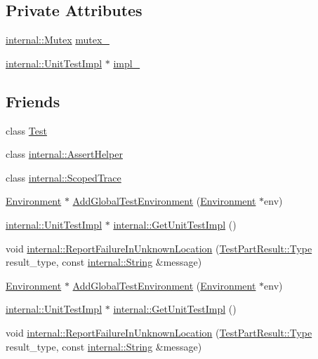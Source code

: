 \subsection*{\-Private \-Attributes}
\begin{DoxyCompactItemize}
\item 
\hyperlink{classtesting_1_1internal_1_1Mutex}{internal\-::\-Mutex} \hyperlink{classtesting_1_1UnitTest_ac9dde2076fedd43264499dc77faea627}{mutex\-\_\-}
\item 
\hyperlink{classtesting_1_1internal_1_1UnitTestImpl}{internal\-::\-Unit\-Test\-Impl} $\ast$ \hyperlink{classtesting_1_1UnitTest_ab9762ae576a7c728237a91400bd2c11f}{impl\-\_\-}
\end{DoxyCompactItemize}
\subsection*{\-Friends}
\begin{DoxyCompactItemize}
\item 
class \hyperlink{classtesting_1_1UnitTest_ab085d1bf4cff8b1045750706b11f8662}{\-Test}
\item 
class \hyperlink{classtesting_1_1UnitTest_a7375bdc46f0244d0011c2d15ee160473}{internal\-::\-Assert\-Helper}
\item 
class \hyperlink{classtesting_1_1UnitTest_ac93c943076897e55055643c28d06415d}{internal\-::\-Scoped\-Trace}
\item 
\hyperlink{classtesting_1_1Environment}{\-Environment} $\ast$ \hyperlink{classtesting_1_1UnitTest_a5ec26e4c31220ff8e769cc09689a4d6d}{\-Add\-Global\-Test\-Environment} (\hyperlink{classtesting_1_1Environment}{\-Environment} $\ast$env)
\item 
\hyperlink{classtesting_1_1internal_1_1UnitTestImpl}{internal\-::\-Unit\-Test\-Impl} $\ast$ \hyperlink{classtesting_1_1UnitTest_a56e56be7066957d612e53b5c60f6ac08}{internal\-::\-Get\-Unit\-Test\-Impl} ()
\item 
void \hyperlink{classtesting_1_1UnitTest_a8aa1029abd3a382c716d1c91fb16fe9c}{internal\-::\-Report\-Failure\-In\-Unknown\-Location} (\hyperlink{classtesting_1_1TestPartResult_a1d1cfd8ffb84e947f82999c682b666a7}{\-Test\-Part\-Result\-::\-Type} result\-\_\-type, const \hyperlink{classtesting_1_1internal_1_1String}{internal\-::\-String} \&message)
\item 
\hyperlink{classtesting_1_1Environment}{\-Environment} $\ast$ \hyperlink{classtesting_1_1UnitTest_a5ec26e4c31220ff8e769cc09689a4d6d}{\-Add\-Global\-Test\-Environment} (\hyperlink{classtesting_1_1Environment}{\-Environment} $\ast$env)
\item 
\hyperlink{classtesting_1_1internal_1_1UnitTestImpl}{internal\-::\-Unit\-Test\-Impl} $\ast$ \hyperlink{classtesting_1_1UnitTest_a56e56be7066957d612e53b5c60f6ac08}{internal\-::\-Get\-Unit\-Test\-Impl} ()
\item 
void \hyperlink{classtesting_1_1UnitTest_a8aa1029abd3a382c716d1c91fb16fe9c}{internal\-::\-Report\-Failure\-In\-Unknown\-Location} (\hyperlink{classtesting_1_1TestPartResult_a1d1cfd8ffb84e947f82999c682b666a7}{\-Test\-Part\-Result\-::\-Type} result\-\_\-type, const \hyperlink{classtesting_1_1internal_1_1String}{internal\-::\-String} \&message)
\end{DoxyCompactItemize}


